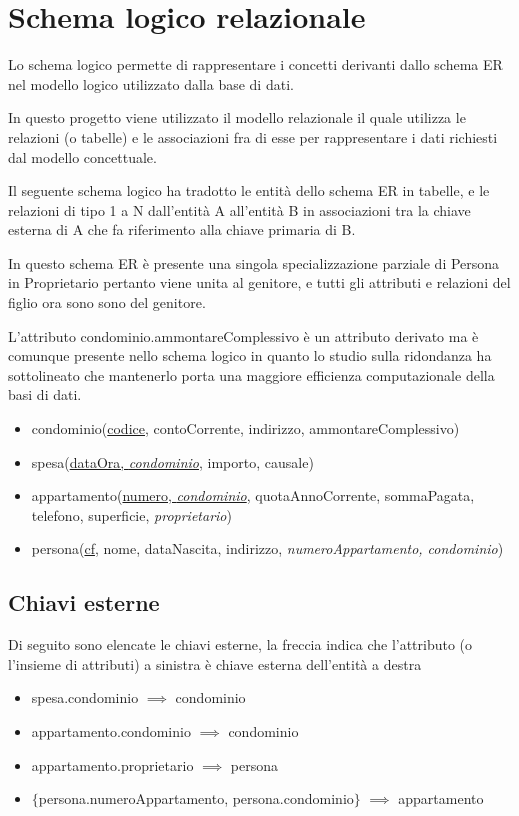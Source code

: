 \section{Schema logico relazionale}
\label{logico}

Lo schema logico permette di rappresentare i concetti derivanti dallo schema ER
nel modello logico utilizzato dalla base di dati.

In questo progetto viene utilizzato il modello relazionale il quale utilizza le relazioni
(o tabelle) e le associazioni fra di esse per rappresentare i dati richiesti dal modello
concettuale.

Il seguente schema logico ha tradotto le entità dello schema ER in tabelle, e le relazioni
di tipo 1 a N dall'entità A all'entità B in associazioni tra la chiave esterna di A che
fa riferimento alla chiave primaria di B.

In questo schema ER è presente una singola specializzazione parziale di Persona in
Proprietario pertanto viene unita al genitore, e tutti gli attributi e relazioni del figlio
ora sono sono del genitore.

L'attributo condominio.ammontareComplessivo è un attributo derivato ma è comunque presente
nello schema logico in quanto lo studio sulla ridondanza ha sottolineato che mantenerlo porta
una maggiore efficienza computazionale della basi di dati.

\begin{itemize}

\item condominio(\underline{codice}, contoCorrente, indirizzo, ammontareComplessivo)

\item spesa(\underline{dataOra, \textit{condominio}}, importo, causale)

\item appartamento(\underline{numero, \textit{condominio}}, quotaAnnoCorrente, sommaPagata, telefono, superficie, \textit{proprietario})

\item persona(\underline{cf}, nome, dataNascita, indirizzo, \textit{numeroAppartamento, condominio})

\end{itemize}

\subsection{Chiavi esterne}

Di seguito sono elencate le chiavi esterne, la freccia indica che l'attributo (o l'insieme di attributi)
a sinistra è chiave esterna dell'entità a destra

\begin{itemize}
	\item spesa.condominio $\implies$ condominio
	\item appartamento.condominio $\implies$ condominio
	\item appartamento.proprietario $\implies$ persona
	\item $\{$persona.numeroAppartamento, persona.condominio$\}$ $\implies$ appartamento
\end{itemize}

